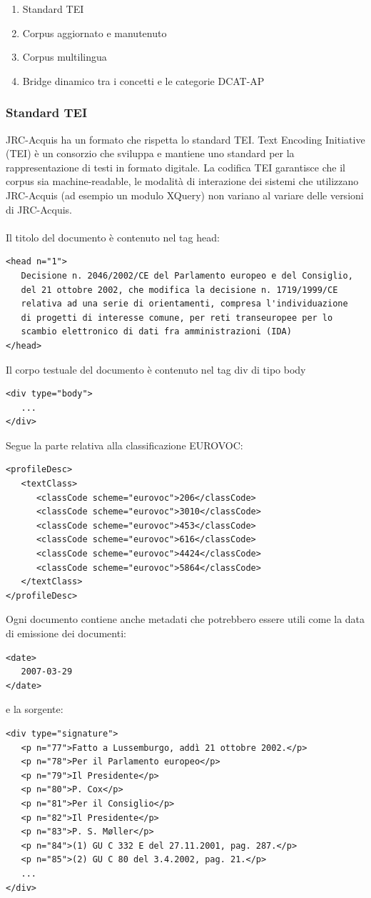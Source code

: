 \documentclass{article}
\theoremstyle{plain}
\theoremstyle{definition}
\begin{document}
\begin{enumerate}
\item Standard TEI
\item Corpus aggiornato e manutenuto
\item Corpus multilingua
\item Bridge dinamico tra i concetti e le categorie DCAT-AP
\end{enumerate}

\subsubsection{Standard TEI}
JRC-Acquis ha un formato che rispetta lo standard TEI.
Text Encoding Initiative (TEI) è un consorzio che sviluppa e mantiene uno standard per la rappresentazione di testi in formato digitale. La codifica TEI garantisce che il corpus sia machine-readable,  le modalità di interazione dei sistemi che utilizzano JRC-Acquis (ad esempio un modulo XQuery) non variano al variare delle versioni di JRC-Acquis.
\\
\\
Il titolo del documento è contenuto nel tag head:
\begin{verbatim}
<head n="1"> 
   Decisione n. 2046/2002/CE del Parlamento europeo e del Consiglio,
   del 21 ottobre 2002, che modifica la decisione n. 1719/1999/CE
   relativa ad una serie di orientamenti, compresa l'individuazione 
   di progetti di interesse comune, per reti transeuropee per lo 
   scambio elettronico di dati fra amministrazioni (IDA)
</head>
\end{verbatim}
Il corpo testuale del documento è contenuto nel tag div di tipo body
\begin{verbatim}
<div type="body">
   ...
</div>
\end{verbatim}
Segue la parte relativa alla classificazione EUROVOC:
\begin{verbatim}
<profileDesc>
   <textClass>
      <classCode scheme="eurovoc">206</classCode>
      <classCode scheme="eurovoc">3010</classCode>
      <classCode scheme="eurovoc">453</classCode>
      <classCode scheme="eurovoc">616</classCode>
      <classCode scheme="eurovoc">4424</classCode>
      <classCode scheme="eurovoc">5864</classCode>
   </textClass>
</profileDesc>
\end{verbatim}
Ogni documento contiene anche metadati che potrebbero essere utili come la data di emissione dei documenti:
\begin{verbatim}
<date>
   2007-03-29
</date>
\end{verbatim}
e la sorgente:
\begin{verbatim}
<div type="signature">
   <p n="77">Fatto a Lussemburgo, addì 21 ottobre 2002.</p>
   <p n="78">Per il Parlamento europeo</p>
   <p n="79">Il Presidente</p>
   <p n="80">P. Cox</p>
   <p n="81">Per il Consiglio</p>
   <p n="82">Il Presidente</p>
   <p n="83">P. S. Møller</p>
   <p n="84">(1) GU C 332 E del 27.11.2001, pag. 287.</p>
   <p n="85">(2) GU C 80 del 3.4.2002, pag. 21.</p>
   ... 
</div>
\end{verbatim}
\end{document}
